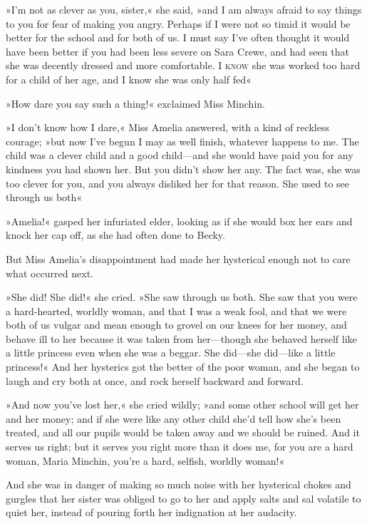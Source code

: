 »I'm not as clever as you, sister,« she said, »and I am always afraid to say things to you for fear of making you angry. Perhaps if I were not so timid it would be better for the school and for both of us. I must say I've often thought it would have been better if you had been less severe on Sara Crewe, and had seen that she was decently dressed and more comfortable. I \textsc{know} she was worked too hard for a child of her age, and I know she was only half fed\longdash«

»How dare you say such a thing!« exclaimed Miss Minchin.

»I don't know how I dare,« Miss Amelia answered, with a kind of reckless courage; »but now I've begun I may as well finish, whatever happens to me. The child was a clever child and a good child—and she would have paid you for any kindness you had shown her. But you didn't show her any. The fact was, she was too clever for you, and you always disliked her for that reason. She used to see through us both\longdash«

»Amelia!« gasped her infuriated elder, looking as if she would box her ears and knock her cap off, as she had often done to Becky.

But Miss Amelia's disappointment had made her hysterical enough not to care what occurred next.

»She did! She did!« she cried. »She saw through us both. She saw that you were a hard-hearted, worldly woman, and that I was a weak fool, and that we were both of us vulgar and mean enough to grovel on our knees for her money, and behave ill to her because it was taken from her—though she behaved herself like a little princess even when she was a beggar. She did—she did—like a little princess!« And her hysterics got the better of the poor woman, and she began to laugh and cry both at once, and rock herself backward and forward.

»And now you've lost her,« she cried wildly; »and some other school will get her and her money; and if she were like any other child she'd tell how she's been treated, and all our pupils would be taken away and we should be ruined. And it serves us right; but it serves you right more than it does me, for you are a hard woman, Maria Minchin, you're a hard, selfish, worldly woman!«

And she was in danger of making so much noise with her hysterical chokes and gurgles that her sister was obliged to go to her and apply salts and sal volatile to quiet her, instead of pouring forth her indignation at her audacity.


